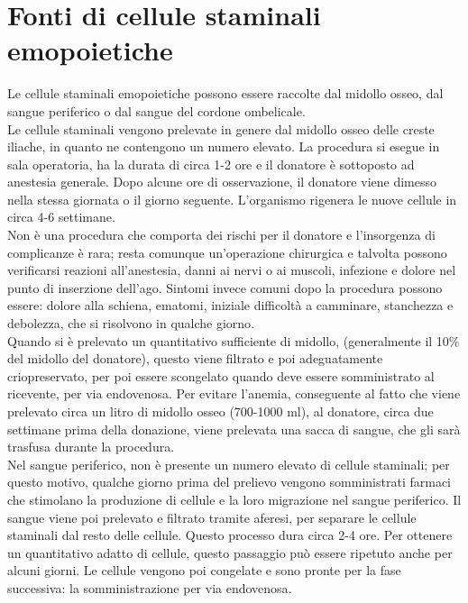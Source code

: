 \section{Fonti di cellule staminali emopoietiche}

Le cellule staminali emopoietiche possono essere raccolte dal midollo osseo, dal sangue periferico o dal sangue del 
cordone ombelicale.\\ 
Le cellule staminali vengono prelevate in genere dal midollo osseo delle creste iliache, in quanto ne contengono un 
numero elevato. La procedura si esegue in sala operatoria, ha la durata di circa 1-2 ore e il donatore è sottoposto 
ad anestesia generale. Dopo alcune ore di osservazione, il donatore viene dimesso nella stessa giornata
o il giorno seguente. L’organismo rigenera le nuove cellule in circa 4-6 settimane\cite{STEMCELLS}.\\ 
Non è una procedura che comporta dei rischi per il donatore e l’insorgenza di complicanze è rara; resta comunque 
un’operazione chirurgica e talvolta possono verificarsi reazioni all’anestesia, danni ai 
nervi o ai muscoli, infezione e dolore nel punto di inserzione dell’ago. 
Sintomi invece comuni dopo la procedura possono essere: dolore alla schiena, ematomi, iniziale difficoltà a camminare, 
stanchezza e debolezza, che si risolvono in qualche giorno\cite{STEMCELLS}.\\ 
Quando si è prelevato un quantitativo sufficiente di midollo, (generalmente il 10\% del midollo del donatore), 
questo viene filtrato e poi adeguatamente criopreservato, per poi essere scongelato quando deve essere somministrato 
al ricevente, per via endovenosa\cite{STEMCELLS}.
Per evitare l’anemia, conseguente al fatto che viene prelevato circa un litro di midollo osseo 
(700-1000 ml), al donatore, circa due settimane prima della donazione, viene prelevata una sacca di sangue, 
che gli sarà trasfusa durante la procedura\cite{TRAPIANTO}.\\

Nel sangue periferico, non è presente un numero elevato di cellule staminali; per questo motivo, qualche 
giorno prima del prelievo vengono somministrati farmaci che stimolano la produzione di cellule e la loro 
migrazione nel sangue periferico. Il sangue viene poi prelevato e filtrato tramite aferesi, per separare le cellule 
staminali dal resto delle cellule. Questo  processo dura circa 2-4 ore. Per ottenere un quantitativo adatto di cellule,
questo passaggio può essere ripetuto anche per alcuni giorni. 
Le cellule vengono poi congelate e sono pronte per la fase successiva: la somministrazione per via endovenosa\cite{STEMCELLS}.\\

